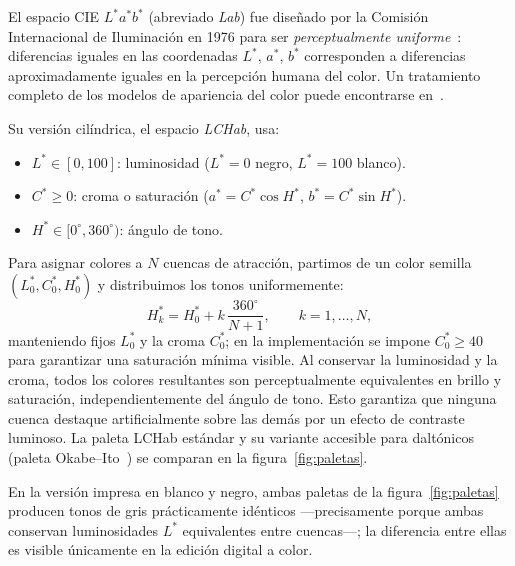\documentclass[11pt,a4paper]{article}
\theoremstyle{plain}
\theoremstyle{definition}
\theoremstyle{remark}
\begin{document}
El espacio CIE $L^*a^*b^*$ (abreviado \emph{Lab}) fue diseñado por la
Comisión Internacional de Iluminación en 1976 para ser
\emph{perceptualmente uniforme}~\cite{Schanda2007}: diferencias iguales
en las coordenadas $L^*$, $a^*$, $b^*$ corresponden a diferencias
aproximadamente iguales en la percepción humana del color.
Un tratamiento completo de los modelos de apariencia del color puede
encontrarse en~\cite{Fairchild2013}.

Su versión cilíndrica, el espacio \emph{LCHab}, usa:
\begin{itemize}
  \item $L^*\in[0,100]$: luminosidad ($L^*=0$ negro, $L^*=100$ blanco).
  \item $C^*\geq 0$: croma o saturación ($a^*=C^*\cos H^*$,\;
        $b^*=C^*\sin H^*$).
  \item $H^*\in[0^\circ,360^\circ)$: ángulo de tono.
\end{itemize}

Para asignar colores a $N$ cuencas de atracción, partimos de un color
semilla $(L_0^*, C_0^*, H_0^*)$ y distribuimos los tonos uniformemente:
\[
  H_k^* = H_0^* + k\,\frac{360^\circ}{N+1}, \qquad k=1,\ldots,N,
\]
manteniendo fijos $L_0^*$ y la croma $C_0^*$; en la implementación se impone $C_0^*\geq 40$ para garantizar una saturación mínima visible.
Al conservar la luminosidad y la croma, todos los colores resultantes
son perceptualmente equivalentes en brillo y saturación, independientemente
del ángulo de tono.
Esto garantiza que ninguna cuenca destaque artificialmente sobre las
demás por un efecto de contraste luminoso.
La paleta LCHab estándar y su variante accesible para daltónicos (paleta Okabe--Ito~\cite{OkabeIto2008}) se comparan en la figura~\ref{fig:paletas}.

En la versi\'{o}n impresa en blanco y negro, ambas paletas de la figura~\ref{fig:paletas} producen tonos de gris pr\'{a}cticamente id\'{e}nticos ---precisamente porque ambas conservan luminosidades $L^*$ equivalentes entre cuencas---; la diferencia entre ellas es visible \'{u}nicamente en la edici\'{o}n digital a color.
\end{document}
